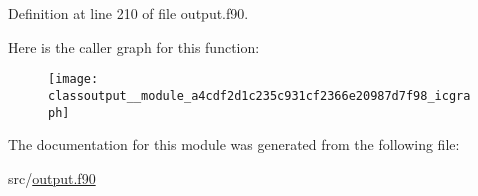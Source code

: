 Definition at line 210 of file output.\-f90.



Here is the caller graph for this function\-:\nopagebreak
\begin{figure}[H]
\begin{center}
\leavevmode
\texttt{[image: classoutput\_\_module\_a4cdf2d1c235c931cf2366e20987d7f98\_icgraph]}
\end{center}
\end{figure}




The documentation for this module was generated from the following file\-:\begin{DoxyCompactItemize}
\item 
src/\hyperlink{output_8f90}{output.\-f90}\end{DoxyCompactItemize}
